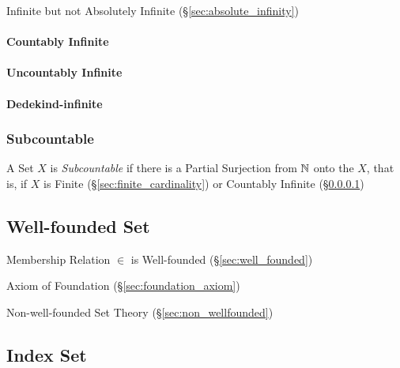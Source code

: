 Infinite but not Absolutely Infinite (\S\ref{sec:absolute_infinity})



\paragraph{Countably Infinite}\label{sec:countably_infinite}\hfill

\paragraph{Uncountably Infinite}\label{sec:uncountably_infinite}\hfill

\paragraph{Dedekind-infinite}\label{sec:dedekind_infinite}\hfill



\subsubsection{Subcountable}\label{sec:subcountable}

A Set $X$ is \emph{Subcountable} if there is a Partial Surjection from
$\mathbb{N}$ onto the $X$, that is, if $X$ is Finite
(\S\ref{sec:finite_cardinality}) or Countably Infinite
(\S\ref{sec:countably_infinite})



\subsection{Well-founded Set}\label{sec:wellfounded_set}

Membership Relation $\in$ is Well-founded (\S\ref{sec:well_founded})

Axiom of Foundation (\S\ref{sec:foundation_axiom})

Non-well-founded Set Theory (\S\ref{sec:non_wellfounded})



\subsection{Index Set}\label{sec:index_set}


